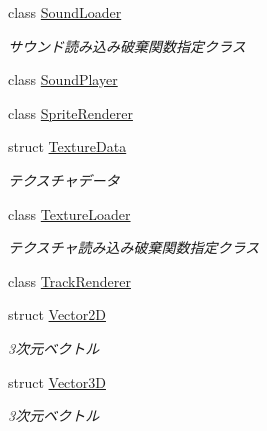 \begin{DoxyCompactItemize}
class \mbox{\hyperlink{class_effekseer_1_1_sound_loader}{Sound\+Loader}}
\begin{DoxyCompactList}\small\item\em サウンド読み込み破棄関数指定クラス \end{DoxyCompactList}\item 
class \mbox{\hyperlink{class_effekseer_1_1_sound_player}{Sound\+Player}}
\item 
class \mbox{\hyperlink{class_effekseer_1_1_sprite_renderer}{Sprite\+Renderer}}
\item 
struct \mbox{\hyperlink{struct_effekseer_1_1_texture_data}{Texture\+Data}}
\begin{DoxyCompactList}\small\item\em テクスチャデータ \end{DoxyCompactList}\item 
class \mbox{\hyperlink{class_effekseer_1_1_texture_loader}{Texture\+Loader}}
\begin{DoxyCompactList}\small\item\em テクスチャ読み込み破棄関数指定クラス \end{DoxyCompactList}\item 
class \mbox{\hyperlink{class_effekseer_1_1_track_renderer}{Track\+Renderer}}
\item 
struct \mbox{\hyperlink{struct_effekseer_1_1_vector2_d}{Vector2D}}
\begin{DoxyCompactList}\small\item\em 3次元ベクトル \end{DoxyCompactList}\item 
struct \mbox{\hyperlink{struct_effekseer_1_1_vector3_d}{Vector3D}}
\begin{DoxyCompactList}\small\item\em 3次元ベクトル \end{DoxyCompactList}\end{DoxyCompactItemize}
